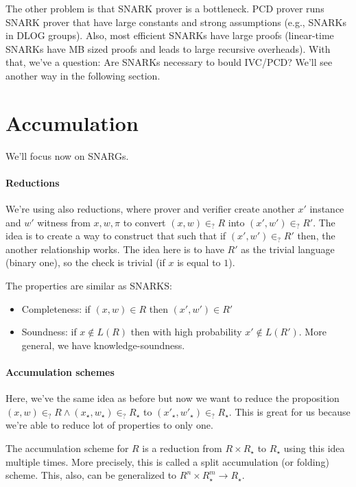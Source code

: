   The other problem is that SNARK prover is a bottleneck.
  PCD prover runs SNARK prover that have large constants and strong assumptions (e.g., SNARKs in DLOG
  groups). Also, most efficient SNARKs have large proofs (linear-time SNARKs have MB sized proofs and leads 
  to large recursive overheads).
  With that, we've a question: Are SNARKs necessary to bould IVC/PCD?
  We'll see another way in the following section.

  \section{Accumulation}
  We'll focus now on SNARGs.

  \paragraph{Reductions}
  We're using also reductions, where prover and verifier create another $x'$ instance and 
  $w'$ witness from $x,w,\pi$ to convert $(x,w)\in_{?} R$ into $(x',w')\in_{?} R'$.
  The idea is to create a way to construct that such that if $(x',w') \in_{?} R'$ then, the another 
  relationship works.
  The idea here is to have $R'$ as the trivial language (binary one), so the check is trivial 
  (if $x$ is equal to $1$).

  The properties are similar as SNARKS:
  \begin{itemize}
    \item Completeness: if $(x,w) \in R$ then $(x',w') \in R'$
    \item Soundness: if $x \notin L(R)$ then with high probability $x' \notin L(R')$.
      More general, we have knowledge-soundness.
  \end{itemize}

  \paragraph{Accumulation schemes}
  Here, we've the same idea as before but now we want to reduce the proposition 
  $(x,w) \in_{?} R \land (x_\star,w_\star) \in_{?} R_\star$ to $(x'_\star,w'_\star) \in_{?} R_\star$.
  This is great for us because we're able to reduce lot of properties to only one.

  The accumulation scheme for $R$ is a reduction from $R \times R_\star$ to $R_\star$
  using this idea multiple times.
  More precisely, this is called a split accumulation (or folding) scheme.
  This, also, can be generalized to $R^n \times R^m_\star \to R_\star$.

